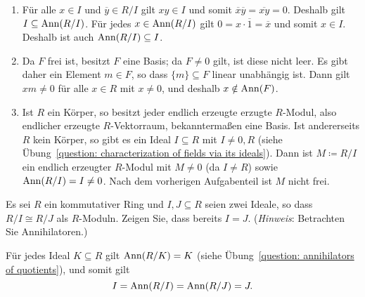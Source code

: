 \begin{solution}
  \begin{enumerate}
    \item
      Für alle $x \in I$ und $\overline{y} \in R/I$ gilt $xy \in I$ und somit $\overline{x} \overline{y} = \overline{xy} = 0$.
      Deshalb gilt $I \subseteq \operatorname{Ann}(R/I)$.
      Für jedes $x \in \operatorname{Ann}(R/I)$ gilt $0 = x \cdot \overline{1} = \overline{x}$ und somit $x \in I$.
      Deshalb ist auch $\operatorname{Ann}(R/I) \subseteq I$.
    \item
      Da $F$ frei ist, besitzt $F$ eine Basis; da $F \neq 0$ gilt, ist diese nicht leer.
      Es gibt daher ein Element $m \in F$, so dass $\{m\} \subseteq F$ linear unabhängig ist.
      Dann gilt $xm \neq 0$ für alle $x \in R$ mit $x \neq 0$, und deshalb $x \notin \operatorname{Ann}(F)$.
    \item
      Ist $R$ ein Körper, so besitzt jeder endlich erzeugte erzugte $R$-Modul, also endlicher erzeugte $R$-Vektorraum, bekanntermaßen eine Basis.
      Ist andererseits $R$ kein Körper, so gibt es ein Ideal $I \subseteq R$ mit $I \neq 0, R$ (siehe Übung~\ref{question: characterization of fields via its ideals}).
      Dann ist $M \coloneqq R/I$ ein endlich erzeugter $R$-Modul mit $M \neq 0$ (da $I \neq R$) sowie $\operatorname{Ann}(R/I) = I \neq 0$.
      Nach dem vorherigen Aufgabenteil ist $M$ nicht frei.
  \end{enumerate}
\end{solution}


\begin{question}[subtitle = Isomorphie von Quotientenringen als Moduln]
  \label{question: quotients isomorphic as modules}
  Es sei $R$ ein kommutativer Ring und $I, J \subseteq R$ seien zwei Ideale, so dass $R/I \cong R/J$ als $R$-Moduln.
  Zeigen Sie, dass bereits $I = J$.
  (\emph{Hinweis}:
   Betrachten Sie Annihilatoren.)
\end{question}


\begin{solution}
  Für jedes Ideal $K \subseteq R$ gilt $\operatorname{Ann}(R/K) = K$ (siehe Übung~\ref{question: annihilators of quotients}), und somit gilt
  \[
      I
    = \operatorname{Ann}(R/I)
    = \operatorname{Ann}(R/J)
    = J.
  \]
\end{solution}


